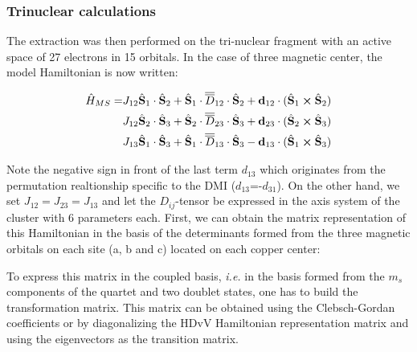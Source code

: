 \documentclass[12pt]{report}
\numberwithin{equation}{section}
\begin{document}
\subsubsection*{Trinuclear calculations}

The extraction was then performed on the tri-nuclear fragment with an active space of 27 electrons in 15 orbitals.
In the case of three magnetic center, the model Hamiltonian is now written:


\begin{equation}
    \begin{split}
    \hat{H}_{MS}=&J_{12} \hat{\vb S}_1 \cdot \hat{\vb S}_2 + \hat{\vb S}_1 \cdot\overline{\overline{D}}_{12} \cdot \hat{\vb S}_2 + \vb{d}_{12} \cdot (\hat{\vb S}_1 \cross \hat{\vb S}_2)\\
    &J_{12} \hat{\vb S}_2 \cdot \hat{\vb S}_3 + \hat{\vb S}_2 \cdot\overline{\overline{D}}_{23} \cdot \hat{\vb S}_3 + \vb{d}_{23} \cdot (\hat{\vb S}_2 \cross \hat{\vb S}_3)\\
    &J_{13} \hat{\vb S}_1 \cdot \hat{\vb S}_3 + \hat{\vb S}_1 \cdot\overline{\overline{D}}_{13} \cdot \hat{\vb S}_3 - \vb{d}_{13} \cdot (\hat{\vb S}_1 \cross \hat{\vb S}_3)
    \end{split}
\end{equation}

Note the negative sign in front of the last term $d_{13}$ which originates from the permutation realtionship specific to the DMI ($d_{13}$=-$d_{31}$).
On the other hand, we set $J_{12}=J_{23}=J_{13}$ and let the $D_{ij}$-tensor be expressed in the axis system of the cluster with 6 parameters each.
First, we can obtain the matrix representation of this Hamiltonian in the basis of the determinants formed from the three magnetic orbitals on each site (a, b and c) located on each copper center:


To express this matrix in the coupled basis, \textit{i.e.} in the basis formed from the $m_s$ components of the quartet and two doublet states, one has to build the transformation matrix.
This matrix can be obtained using the Clebsch-Gordan coefficients or by diagonalizing the HDvV Hamiltonian representation matrix and using the eigenvectors as the transition matrix.
\end{document}
